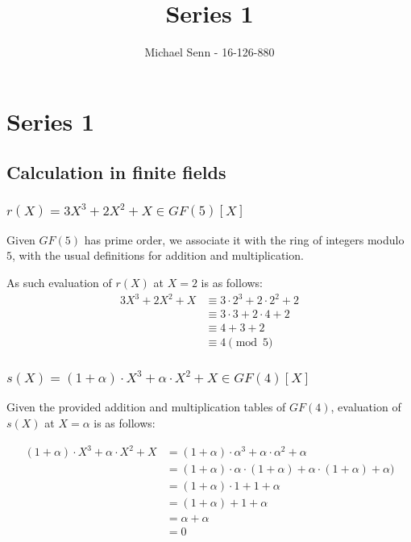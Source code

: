 \documentclass[a4paper]{scrreprt}
\title{Series 1}
\author{Michael Senn \maillink{michael.senn@students.unibe.ch} - 16-126-880}
\date{\printdate}
\begin{document}
\maketitle


\setcounter{chapter}{0}

\chapter{Series 1}

\section{Calculation in finite fields}

\subsection{\texorpdfstring{$r(X) = 3X^3 + 2X^2 + X \in GF(5)[X]$}{r(X)}}

Given $GF(5)$ has prime order, we associate it with the ring of integers modulo
$5$, with the usual definitions for addition and multiplication.

As such evaluation of $r(X)$ at $X = 2$ is as follows:
\begin{align*}
		3X^3 + 2X^2 + X & \equiv 3 \cdot 2^3 + 2 \cdot 2^2 + 2 \\
						& \equiv 3 \cdot 3 + 2 \cdot 4 + 2 \\
						& \equiv 4 + 3 + 2 \\
						& \equiv 4 \pmod 5
\end{align*}

\subsection{\texorpdfstring{$s(X) = (1 + \alpha) \cdot X^3 + \alpha \cdot X^2 + X \in GF(4)[X]$}{s(X)}}

Given the provided addition and multiplication tables of $GF(4)$, evaluation of
$s(X)$ at $X = \alpha$ is as follows:

\begin{align*}
		(1 + \alpha) \cdot X^3 + \alpha \cdot X^2 + X & = (1 + \alpha) \cdot \alpha^3 + \alpha \cdot \alpha^2 + \alpha \\
													  & = (1 + \alpha) \cdot \alpha \cdot (1 + \alpha) + \alpha \cdot (1 + \alpha) + \alpha) \\
													  & = (1 + \alpha) \cdot 1 + 1 + \alpha \\
													  & = (1 + \alpha) + 1 + \alpha \\
													  & = \alpha + \alpha \\
													  & = 0
\end{align*}
\end{document}
